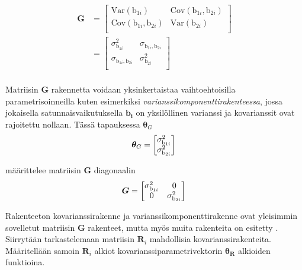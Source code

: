 \documentclass[finnish]{docopts}
\begin{document}
$$
\begin{aligned}
\bm{G} &=
\begin{bmatrix}
\text{Var}(\text{b}_{1i}) & \text{Cov}(\text{b}_{1i}, \text{b}_{2i}) \\
\text{Cov}(\text{b}_{1i}, \text{b}_{2i}) & \text{Var}(\text{b}_{2i}) \\
\end{bmatrix} \\
&=
\begin{bmatrix}
\sigma^2_{\text{b}_{1i}} & \sigma_{\text{b}_{1i}, \text{b}_{2i}} \\
\sigma_{\text{b}_{1i}, \text{b}_{2i}} & \sigma^2_{\text{b}_{2i}} \\
\end{bmatrix} \\
\end{aligned}
$$

Matriisin $\bm{G}$ rakennetta voidaan yksinkertaistaa vaihtoehtoisilla parametrisoinneilla kuten esimerkiksi \textit{varianssikomponenttirakenteessa}, jossa jokaisella satunnaisvaikutuksella $\bm{b_i}$ on yksilöllinen varianssi ja kovarianssit ovat rajoitettu nollaan. Tässä tapauksessa $\bm{\theta}_G$ \\

$$
\bm{\theta}_G =
\begin{bmatrix}
\sigma^2_{\text{b}_{1i}}\\
\sigma^2_{\text{b}_{2i}} \\
\end{bmatrix}\\
$$

määrittelee matriisin $\bm{G}$ diagonaalin \\

$$
\bm{G} =
\begin{bmatrix}
\sigma^2_{\text{b}_{1i}} & 0 \\
0 & \sigma^2_{\text{b}_{2i}} \\
\end{bmatrix} \\
$$

Rakenteeton kovarianssirakenne ja varianssikomponenttirakenne ovat yleisimmin sovelletut matriisin $\bm{G}$ rakenteet, mutta myös muita rakenteita on esitetty \cite{west14}. \\

Siirrytään tarkastelemaan matriisin $\bm{R}_i$ mahdollisia kovarianssirakenteita. Määritellään samoin $\bm{R}_i$ alkiot kovarianssiparametrivektorin $\bm{\theta_R}$ alkioiden funktioina.\\
\end{document}
